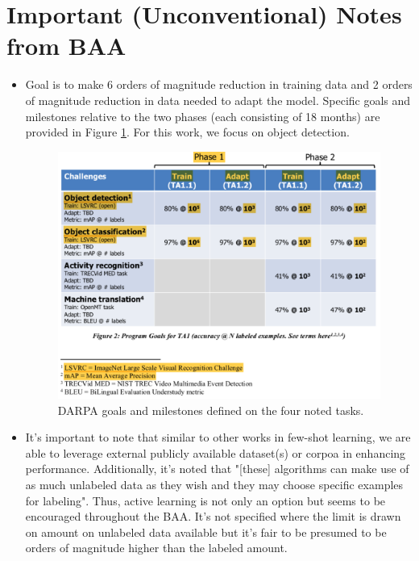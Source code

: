 \documentclass{article}
\begin{document}
\section{Important (Unconventional) Notes from BAA}
\begin{itemize}
    \item Goal is to make 6 orders of magnitude reduction in training data and 2 orders of magnitude reduction in data needed to adapt the model. Specific goals and milestones relative to the two phases (each consisting of 18 months) are provided in Figure \ref{goals}. For this work, we focus on object detection.
    \begin{figure}[t]
        \centering
        \includegraphics[width=6in]{Goals.png}
        \caption{DARPA goals and milestones defined on the four noted tasks.}
        \label{goals}
    \end{figure}
    \item It's important to note that similar to other works in few-shot learning, we are able to leverage external publicly available dataset(s) or corpoa in enhancing performance. Additionally, it's noted that "[these] algorithms can make use of as much unlabeled data as they wish and they may choose specific examples for labeling". Thus, active learning is not only an option but seems to be encouraged throughout the BAA. It's not specified where the limit is drawn on amount on unlabeled data available but it's fair to be presumed to be orders of magnitude higher than the labeled amount.
\end{itemize}
\end{document}
